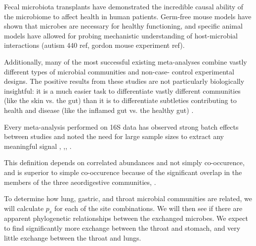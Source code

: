 \documentclass[12pt]{article}
\begin{document}
Fecal microbiota transplants have demonstrated the incredible
causal ability of the microbiome to affect health in 
human patients. Germ-free mouse models have shown that microbes are
necessary for healthy functioning, and specific animal models have  
allowed for probing mechanistic understanding of host-microbial 
interactions (autism 440 ref, gordon mouse experiment ref). 

Additionally, many of the most successful existing meta-analyses 
combine vastly different types of microbial communities and non-case-
control experimental designs. The positive results from these studies 
are not particularly biologically insightful: it is a much easier task 
to differentiate vastly different communities (like the skin vs. the 
gut) than it is to differentiate subtleties contributing to health and 
disease (like the inflamed gut vs. the healthy gut) \cite{knights-supervised-2010}.

Every meta-analysis performed on 16S data has observed 
strong batch effects between studies and noted the need for large 
sample sizes to extract any meaningful signal \cite{sze-signal-2016},
\cite{walters-ob_meta-2014},\cite{knights-supervised-2010},
\cite{lozupone-meta-2013}. 

This definition depends on correlated abundances and not simply co-occurence, and is 
superior to simple co-occurence because of the significant overlap in the
members of the three aeordigestive communities\cite{bassis-source-2015}, \cite{charslon-topographical-2011}.

To determine how lung, gastric, and throat microbial communities are related,
we will calculate $p_s$ for each of the site combinations. We will 
then see if there are apparent phylogenetic relationships between
the exchanged microbes. We expect to find significantly more exchange
between the throat and stomach, and very little exchange between the throat and lungs. 




\end{document}
